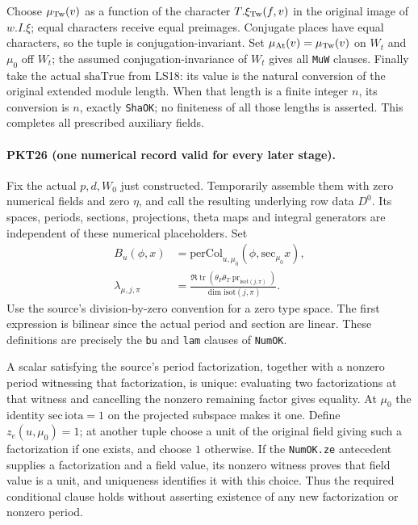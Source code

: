 Choose $\mu_{\rm Tw}(v)$ as a function of the character
$T.\xi_{\rm Tw}(f,v)$ in the original image of $w.I.\xi$; equal
characters receive equal preimages.  Conjugate places have equal characters,
so the tuple is conjugation-invariant.  Set
$\mu_{\rm At}(v)=\mu_{\rm Tw}(v)$ on $W_t$ and $\mu_0$ off $W_t$;
the assumed conjugation-invariance of $W_t$ gives all \texttt{MuW} clauses.
Finally take the actual $\mathrm{shaTrue}$ from LS18: its value is the
natural conversion of the original extended module length.  When that
length is a finite integer $n$, its conversion is $n$, exactly
\texttt{ShaOK}; no finiteness of all those lengths is asserted.  This
completes all prescribed auxiliary fields.

\paragraph{PKT26 (one numerical record valid for every later stage).}\label{claim:PKT26}
Fix the actual $p,d,W_0$ just constructed.  Temporarily assemble them with
zero numerical fields and zero $\eta$, and call the resulting underlying
row data $D^0$.  Its spaces, periods, sections, projections, theta maps and
integral generators are independent of these numerical placeholders.  Set
\[
\begin{split}
 B_u(\phi,x)&=\mathrm{perCol}_{u,\mu_0}(\phi,
                                      \mathrm{sec}_{\mu_0}x),\\
 \lambda_{\mu,j,\pi}
 &=\frac{\Re\operatorname{tr}
   (\theta_P\theta_T\operatorname{pr}_{\mathrm{isot}(j,\pi)})}
          {\dim\mathrm{isot}(j,\pi)}.
\end{split}\tag{PKT.27}
\]
Use the source's division-by-zero convention for a zero type space.  The
first expression is bilinear since the actual period and section are
linear.  These definitions are precisely the \texttt{bu} and
\texttt{lam} clauses of \texttt{NumOK}.

A scalar satisfying the source's period factorization, together with a
nonzero period witnessing that factorization, is unique: evaluating two
factorizations at that witness and cancelling the nonzero remaining factor
gives equality.  At $\mu_0$ the identity
$\mathrm{sec}\,\mathrm{iota}=1$ on the projected subspace makes it one.
Define $z_e(u,\mu_0)=1$; at another tuple choose a unit of the original
field giving such a factorization if one exists, and choose $1$ otherwise.
If the \texttt{NumOK.ze} antecedent supplies a factorization and a field
value, its nonzero witness proves that field value is a unit, and uniqueness
identifies it with this choice.  Thus the required conditional clause holds
without asserting existence of any new factorization or nonzero period.

